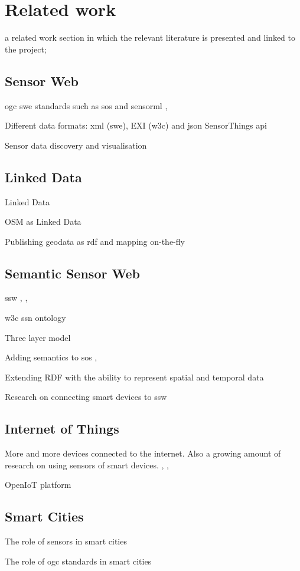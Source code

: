 \chapter{Related work}
\label{chap:rw}

a related work section in which the relevant literature is presented and linked to the project;


\section{Sensor Web}
\ac{ogc} \ac{swe} standards such as \ac{sos} and \ac{sensorml} \citep{SW:OGC}, \citep{SW:Botts}

Different data formats: \ac{xml} (\ac{swe}), EXI (\ac{w3c}) and \ac{json} SensorThings \ac{api} \citep{IOT:Zanelli}

Sensor data discovery \citep{SW:OGC2} and visualisation \citep{SW:Yoo}


\section{Linked Data}
Linked Data \citep{LD:Berners-lee}

OSM as Linked Data \citep{LD:Auer}

Publishing geodata as \ac{rdf} and mapping on-the-fly \citep{LD:Missier}


\section{Semantic Sensor Web}
\ac{ssw} \citep{SSW:Sheth}, \citep{SSW:deMel}, \citep{SSW:Bakillah}

\ac{w3c} \ac{ssn} ontology \citep{SSW:SSN_incubatorGroup}

Three layer model 

Adding semantics to \ac{sos} \citep{SSW:Henson}, \citep{SSW:Pschorr}

Extending RDF with the ability to represent spatial and temporal data \citep{SSW:Koubarakis}

Research on connecting smart devices to \ac{ssw} \citep{SSW:Vera}  


\section{Internet of Things}
More and more devices connected to the internet. Also a growing amount of research on using sensors of smart devices. \citep{IOT:Waher}, \citep{SSW:Calbimonte}, \citep{IOT:Zarko}


OpenIoT platform \citep{IOT:Calbimonte}


\section{Smart Cities}
The role of sensors in smart cities \citep{IOT:Zanelli}

The role of \ac{ogc} standards in smart cities \citep{SC:OGC}
